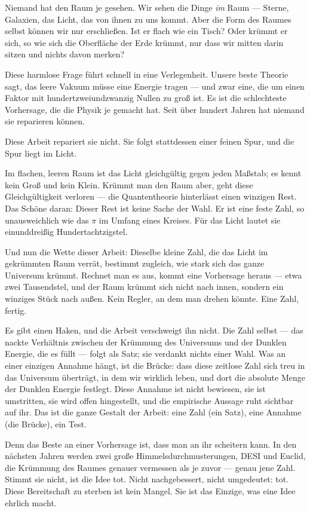 \documentclass[11pt,a4paper]{article}
\theoremstyle{definition}
\theoremstyle{remark}
\begin{document}
\medskip
Niemand hat den Raum je gesehen. Wir sehen die Dinge \emph{im} Raum --- Sterne, Galaxien, das
Licht, das von ihnen zu uns kommt. Aber die Form des Raumes selbst können wir nur erschließen. Ist
er flach wie ein Tisch? Oder krümmt er sich, so wie sich die Oberfläche der Erde krümmt, nur dass
wir mitten darin sitzen und nichts davon merken?

Diese harmlose Frage führt schnell in eine Verlegenheit. Unsere beste Theorie sagt, das leere
Vakuum müsse eine Energie tragen --- und zwar eine, die um einen Faktor mit hundertzweiundzwanzig
Nullen zu groß ist. Es ist die schlechteste Vorhersage, die die Physik je gemacht hat. Seit über
hundert Jahren hat niemand sie reparieren können.

Diese Arbeit repariert sie nicht. Sie folgt stattdessen einer feinen Spur, und die Spur liegt im
Licht.

Im flachen, leeren Raum ist das Licht gleichgültig gegen jeden Maßstab; es kennt kein Groß und kein
Klein. Krümmt man den Raum aber, geht diese Gleichgültigkeit verloren --- die Quantentheorie
hinterlässt einen winzigen Rest. Das Schöne daran: Dieser Rest ist keine Sache der Wahl. Er ist
eine feste Zahl, so unausweichlich wie das $\pi$ im Umfang eines Kreises. Für das Licht lautet sie
einunddreißig Hundertachtzigstel.

Und nun die Wette dieser Arbeit: Dieselbe kleine Zahl, die das Licht im gekrümmten Raum verrät,
bestimmt zugleich, wie stark sich das ganze Universum krümmt. Rechnet man es aus, kommt eine
Vorhersage heraus --- etwa zwei Tausendstel, und der Raum krümmt sich nicht nach innen, sondern ein
winziges Stück nach außen. Kein Regler, an dem man drehen könnte. Eine Zahl, fertig.

Es gibt einen Haken, und die Arbeit verschweigt ihn nicht. Die Zahl selbst --- das nackte
Verhältnis zwischen der Krümmung des Universums und der Dunklen Energie, die es füllt --- folgt als
Satz; sie verdankt nichts einer Wahl. Was an einer einzigen Annahme hängt, ist die Brücke: dass
diese zeitlose Zahl sich treu in das Universum überträgt, in dem wir wirklich leben, und dort die
absolute Menge der Dunklen Energie festlegt. Diese Annahme ist nicht bewiesen, sie ist umstritten,
sie wird offen hingestellt, und die empirische Aussage ruht sichtbar auf ihr. Das ist die ganze
Gestalt der Arbeit: eine Zahl (ein Satz), eine Annahme (die Brücke), ein Test.

Denn das Beste an einer Vorhersage ist, dass man an ihr scheitern kann. In den nächsten Jahren
werden zwei große Himmelsdurchmusterungen, DESI und Euclid, die Krümmung des Raumes genauer
vermessen als je zuvor --- genau jene Zahl. Stimmt sie nicht, ist die Idee tot. Nicht nachgebessert,
nicht umgedeutet: tot. Diese Bereitschaft zu sterben ist kein Mangel. Sie ist das Einzige, was eine
Idee ehrlich macht.
\end{document}
